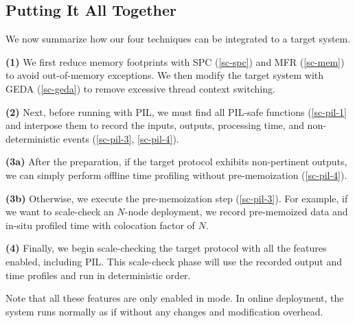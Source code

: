 \subsection{Putting It All Together}
\label{sc-summ}

 We now summarize how our four \sck techniques
can be integrated to a target system.  


{\bf (1)} We first reduce memory footprints with SPC (\sec\ref{sc-spc}) and MFR
(\sec\ref{sc-mem}) to avoid out-of-memory exceptions.  We then modify the
target system with GEDA (\sec\ref{sc-geda}) to remove excessive thread context
switching.  

{\bf (2)} Next, before running \sck with PIL, we must find all PIL-safe
functions (\sec\ref{sc-pil-1} and interpose them to record the inputs, outputs,
processing time, and non-deterministic events (\sec\ref{sc-pil-3},
\sec\ref{sc-pil-4}).

%

{\bf (3a)} After the preparation, if the target protocol exhibits
non-pertinent outputs, we can simply perform offline time profiling without
pre-memoization (\sec\ref{sc-pil-4}).

{\bf (3b)} Otherwise, we execute the pre-memoization step
(\sec\ref{sc-pil-3}).  For example,
if we want to scale-check an $N$-node deployment, 
we record pre-memoized data and in-situ profiled time with
colocation factor of $N$.  

{\bf (4)} Finally, we begin scale-checking the target protocol with all
the features enabled, including PIL.  This scale-check phase will use the
recorded output and time profiles and run in deterministic order.

Note that all these features are only enabled in \sck mode.  In online
deployment, the system runs normally as if without any changes and
modification overhead.


